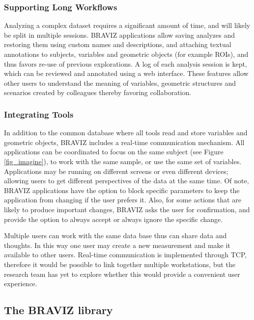 \documentclass{frontiersHLTH}
\begin{document}
\subsubsection{Supporting Long Workflows}

Analyzing a complex dataset requires a significant amount of time, and will likely be split in multiple sessions. BRAVIZ applications allow saving analyzes and restoring them using custom names and descriptions, and attaching textual annotations to subjects, variables and geometric objects (for example ROIs), and thus favors re-use of previous explorations. A log of each analysis session is kept, which can be reviewed and annotated using a web interface. These features allow other users to understand the meaning of variables, geometric structures and scenarios created by colleagues thereby favoring collaboration. 

\subsubsection{Integrating Tools}

In addition to the common database where all tools read and store variables and geometric objects, BRAVIZ includes a real-time communication mechanism. All applications can be coordinated to focus on the same subject (see Figure \ref{fig_imagine}), to work with the same sample, or use the same set of variables. Applications may be running on different screens or even different devices; allowing users to get different perspectives of the data at the same time. Of note, BRAVIZ applications have the option to block specific parameters to keep the application from changing if the user prefers it. Also, for some actions that are likely to produce important changes, BRAVIZ asks the user for confirmation, and provide the option to always accept or always ignore the specific change.

Multiple users can work with the same data base thus can share data and thoughts. In this way one user may create a new measurement and make it available to other users. Real-time communication is implemented through TCP, therefore it would be possible to link together multiple workstations, but the research team has yet to explore whether this would provide a convenient user experience.

\subsection{The BRAVIZ library}
\end{document}
